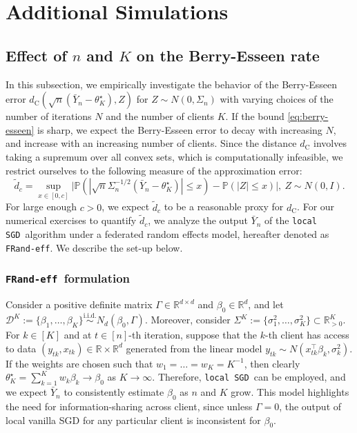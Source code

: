 \documentclass[a4paper,11pt]{article}
\numberwithin{equation}{section}
\theoremstyle{plain}
\theoremstyle{remark}
\def\R{\mathbb{R}}
\newcommand{\DFL}{\texttt{local SGD}}
\newcommand{\minparam}{\theta^\star_K}
\newcommand{\IP}{\mathbb{P}}
\newcommand{\model}{\texttt{FRand-eff}}
\begin{document}
\section{Additional Simulations} \label{se:app-simu}


\subsection{Effect of $n$ and $K$ on the Berry-Esseen rate}  \label{se:simu-main-1}
In this subsection, we empirically investigate the behavior of the Berry-Esseen error $d_{\mathrm{C}}(\sqrt{n}(\bar{Y}_n - \minparam), Z)$ for $Z \sim N(0, \Sigma_n)$ with varying choices of the number of iterations $N$ and the number of clients $K$. If the bound \eqref{eq:berry-esseen} is sharp, we expect the Berry-Esseen error to decay with increasing $N$, and increase with an increasing number of clients. Since the distance $d_{\mathrm{C}}$ involves taking a supremum over all convex sets, which is computationally infeasible, we restrict ourselves to the following measure of the approximation error:
\[ \tilde{d}_c=\sup_{x \in [0,c]}\big|\IP(|\sqrt{n}\Sigma_n^{-1/2}(\bar{Y}_n - \minparam)|\leq x) - \IP(|Z|\leq x)\big|, \ Z\sim N(0, I). \]
For large enough $c>0$, we expect $\tilde{d}_c$ to be a reasonable proxy for $d_{\mathrm{C}}$. For our numerical exercises to quantify $\tilde{d}_c$, we analyze the output $\bar{Y}_n$ of the \DFL\ algorithm under a federated random effects model, hereafter denoted as \model. We describe the set-up below.
\subsubsection{\model\ formulation}\label{se:randeffmodel}
Consider a positive definite matrix $\Gamma \in \R^{d \times d}$ and $\beta_0\in \R^d$, and let $\mathcal{D}^K :=\{\beta_1, \ldots, \beta_K\} \overset{\text{i.i.d.}}{\sim}N_d(\beta_0, \Gamma)$. Moreover, consider $\Sigma^K:=\{\sigma_1^2, \ldots, \sigma_K^2\} \subset \R^K_{>0}$. For $k\in [K]$ and at $t\in [n]$-th iteration, suppose that the $k$-th client has access to data $(y_{tk}, x_{tk})\in \R \times \R^d$ generated from the linear model
$y_{tk} \sim N(x_{tk}^\top \beta_k, \sigma_k^2)$. If the weights are chosen such that $w_1= \ldots= w_K=K^{-1}$, then clearly $\minparam=\sum_{k=1}^K w_k \beta_k \to \beta_0$ as $K\to \infty$. Therefore, \DFL\ can be employed, and we expect $\bar{Y}_n$ to consistently estimate $\beta_0$ as $n$ and $K$ grow. This model highlights the need for information-sharing across client, since unless $\Gamma=0$, the output of local vanilla SGD for any particular client is inconsistent for $\beta_0$.
\end{document}

